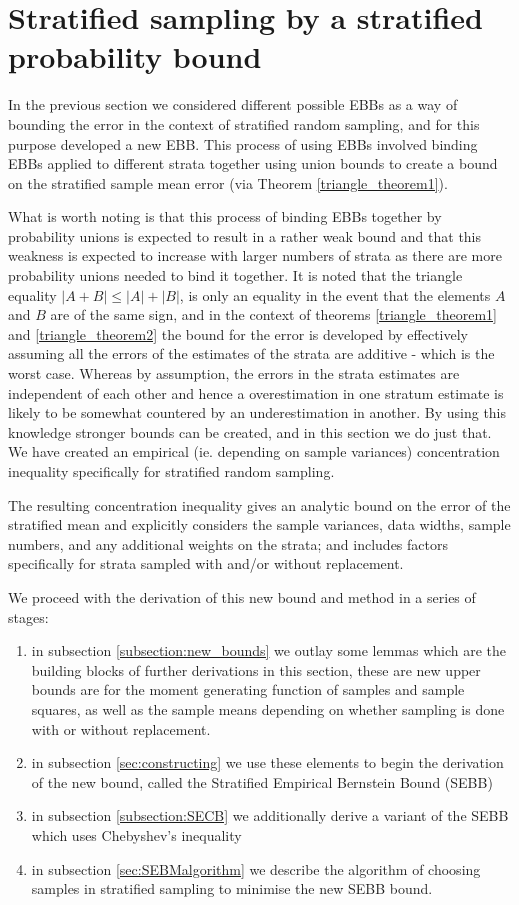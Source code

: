 

\section{Stratified sampling by a stratified probability bound}\label{section:SEBB}

In the previous section we considered different possible EBBs as a way of bounding the error in the context of stratified random sampling, and for this purpose developed a new EBB.
This process of using EBBs involved binding EBBs applied to different strata together using union bounds to create a bound on the stratified sample mean error (via Theorem \ref{triangle_theorem1}).

What is worth noting is that this process of binding EBBs together by probability unions is expected to result in a rather weak bound and that this weakness is expected to increase with larger numbers of strata as there are more probability unions needed to bind it together.
It is noted that the triangle equality $|A+B|\le |A|+|B|$, is only an equality in the event that the elements $A$ and $B$ are of the same sign, and in the context of theorems \ref{triangle_theorem1} and \ref{triangle_theorem2} the bound for the error is developed by effectively assuming all the errors of the estimates of the strata are additive - which is the worst case.
Whereas by assumption, the errors in the strata estimates are independent of each other and hence a overestimation in one stratum estimate is likely to be somewhat countered by an underestimation in another.
By using this knowledge stronger bounds can be created, and in this section we do just that. We have created an empirical (ie. depending on sample variances) concentration inequality specifically for stratified random sampling.

The resulting concentration inequality gives an analytic bound on the error of the stratified mean and explicitly considers the sample variances, data widths, sample numbers, and any additional weights on the strata; and includes factors specifically for strata sampled with and/or without replacement.

We proceed with the derivation of this new bound and method in a series of stages:
\begin{enumerate}
\item	in subsection \ref{subsection:new_bounds} we outlay some lemmas which are the building blocks of further derivations in this section, these are new upper bounds are for the moment generating function of samples and sample squares, as well as the sample means depending on whether sampling is done with or without replacement.
\item	in subsection \ref{sec:constructing} we use these elements to begin the derivation of the new bound, called the Stratified Empirical Bernstein Bound (SEBB)
\item	in subsection \ref{subsection:SECB} we additionally derive a variant of the SEBB which uses Chebyshev's inequality
\item	in subsection \ref{sec:SEBMalgorithm} we describe the algorithm of choosing samples in stratified sampling to minimise the new SEBB bound.
\end{enumerate}


